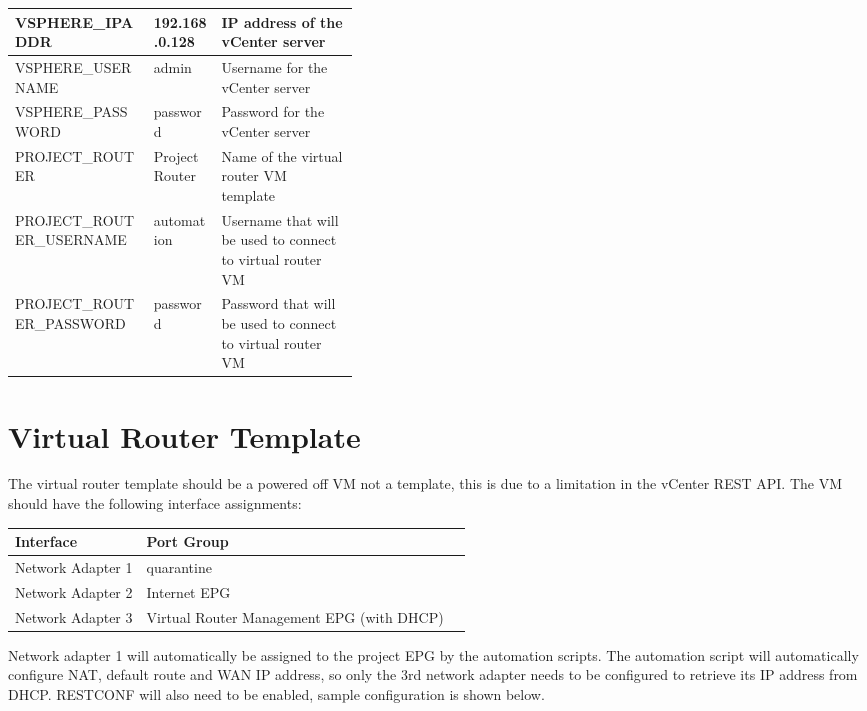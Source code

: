 \begin{table}[H]
\begin{tabular}{l l p{0.4\linewidth}}
        
        VSPHERE\_IPADDR           & 192.168.0.128    & IP address of the vCenter server                                                                                    \\            \hline
        
        VSPHERE\_USERNAME         & admin            & Username for the vCenter server                                                                                     \\            \hline
        
        VSPHERE\_PASSWORD         & password         & Password for the vCenter server                                                                                     \\            \hline
        
        PROJECT\_ROUTER           & ProjectRouter    & Name of the virtual router VM template                                                                              \\        \hline
        PROJECT\_ROUTER\_USERNAME & automation       & Username that will be used to connect to virtual router VM                                                          \\ \hline
        PROJECT\_ROUTER\_PASSWORD & password         & Password that will be used to connect to virtual router VM                                                          \\ \hline
    \end{tabular}
\end{table}

\section*{Virtual Router Template}
The virtual router template should be a powered off VM not a template, this is due to a limitation in the vCenter REST API. The VM should have the following interface assignments:
\begin{table}[H]
    \centering
    \begin{tabular}{l l l}
        \textbf{Interface} & \textbf{Port Group}                       \\
        \hline
        Network Adapter 1  & quarantine                                \\
        Network Adapter 2  & Internet EPG                              \\
        Network Adapter 3  & Virtual Router Management EPG (with DHCP) \\
    \end{tabular}
\end{table}
Network adapter 1 will automatically be assigned to the project EPG by the automation scripts. The automation script will automatically configure NAT, default route and WAN IP address, so only the 3rd network adapter needs to be configured to retrieve its IP address from DHCP. RESTCONF will also need to be enabled, sample configuration is shown below.

